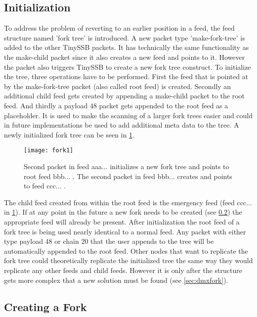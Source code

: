\subsection{Initialization}
To address the problem of reverting to an earlier position in a feed, the feed structure named 'fork tree' is introduced. A new packet type 'make-fork-tree' is added to the other TinySSB packets. It has technically the same functionality as the make-child packet since it also creates a new feed and points to it. However the packet also triggers TinySSB to create a new fork tree construct. To initialize the tree, three operations have to be performed. First the feed that is pointed at by the make-fork-tree packet (also called root feed) is created. Secondly an additional child feed gets created by appending a make-child packet to the root feed. And thirdly a payload 48 packet gets appended to the root feed as a placeholder. It is used to make the scanning of a larger fork trees easier and could in future implementations be used to add additional meta data to the tree. A newly initialized fork tree can be seen in \cref{fig:fork1}.

\begin{figure}
\centering
\texttt{[image: fork1]}
\caption{Second packet in feed aaa... initializes a new fork tree and points to root feed bbb... . The second packet in feed bbb... creates and points to feed ccc... .}
\label{fig:fork1}
\end{figure}
 
The child feed created from within the root feed is the emergency feed (feed ccc... in \cref{fig:fork1}). If at any point in the future a new fork needs to be created (see \cref{sec:forking}) the appropriate feed will already be present. After initialization the root feed of a fork tree is being used nearly identical to a normal feed. Any packet with either type payload 48 or chain 20 that the user appends to the tree will be automatically appended to the root feed. Other nodes that want to replicate the fork tree could theoretically replicate the initialized tree the same way they would replicate any other feeds and child feeds. However it is only after the structure gets more complex that a new solution must be found (see \cref{sec:dmxfork}).

\subsection{Creating a Fork}
\label{sec:forking}

